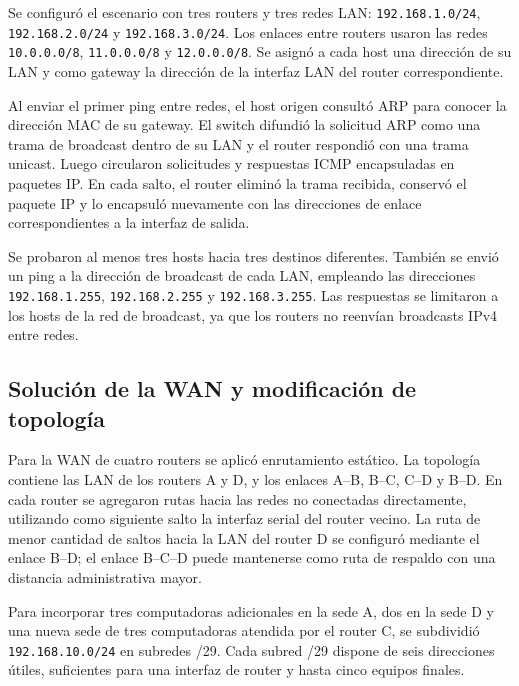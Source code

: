 \documentclass[a4paper,12pt]{article}
\newcommand{\ip}[1]{\texttt{#1}}
\begin{document}
Se configuró el escenario con tres routers y tres redes LAN: \ip{192.168.1.0/24}, \ip{192.168.2.0/24} y \ip{192.168.3.0/24}. Los enlaces entre routers usaron las redes \ip{10.0.0.0/8}, \ip{11.0.0.0/8} y \ip{12.0.0.0/8}. Se asignó a cada host una dirección de su LAN y como gateway la dirección de la interfaz LAN del router correspondiente.


Al enviar el primer ping entre redes, el host origen consultó ARP para conocer la dirección MAC de su gateway. El switch difundió la solicitud ARP como una trama de broadcast dentro de su LAN y el router respondió con una trama unicast. Luego circularon solicitudes y respuestas ICMP encapsuladas en paquetes IP. En cada salto, el router eliminó la trama recibida, conservó el paquete IP y lo encapsuló nuevamente con las direcciones de enlace correspondientes a la interfaz de salida.

Se probaron al menos tres hosts hacia tres destinos diferentes. También se envió un ping a la dirección de broadcast de cada LAN, empleando las direcciones \ip{192.168.1.255}, \ip{192.168.2.255} y \ip{192.168.3.255}. Las respuestas se limitaron a los hosts de la red de broadcast, ya que los routers no reenvían broadcasts IPv4 entre redes.


\subsection*{Solución de la WAN y modificación de topología}

Para la WAN de cuatro routers se aplicó enrutamiento estático. La topología contiene las LAN de los routers A y D, y los enlaces A--B, B--C, C--D y B--D. En cada router se agregaron rutas hacia las redes no conectadas directamente, utilizando como siguiente salto la interfaz serial del router vecino. La ruta de menor cantidad de saltos hacia la LAN del router D se configuró mediante el enlace B--D; el enlace B--C--D puede mantenerse como ruta de respaldo con una distancia administrativa mayor.

Para incorporar tres computadoras adicionales en la sede A, dos en la sede D y una nueva sede de tres computadoras atendida por el router C, se subdividió \ip{192.168.10.0/24} en subredes /29. Cada subred /29 dispone de seis direcciones útiles, suficientes para una interfaz de router y hasta cinco equipos finales.
\end{document}
